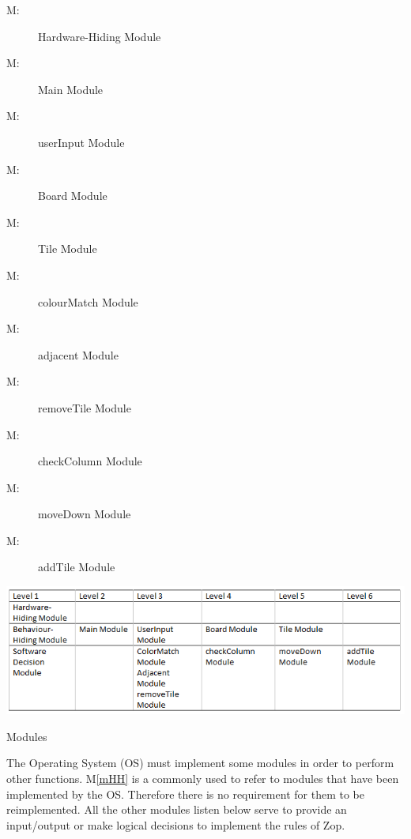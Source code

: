\documentclass[12pt]{article}
\newcounter{mnum}
\newcommand{\mthemnum}{M\themnum}
\newcommand{\mref}[1]{M\ref{#1}}
\begin{document}
\begin{description}
\item [ \mthemnum \label{mHH}:] Hardware-Hiding Module
\item [ \mthemnum \label{mMain}:] Main Module
\item [ \mthemnum \label{mUI}:] userInput Module
\item [ \mthemnum \label{mBoard}:] Board Module
\item [ \mthemnum \label{mTile}:] Tile Module
\item [ \mthemnum \label{mColor}:] colourMatch Module
\item [ \mthemnum \label{mAdj}:] adjacent Module
\item [ \mthemnum \label{mRemove}:] removeTile Module
\item [ \mthemnum \label{mCol}:] checkColumn Module
\item [ \mthemnum \label{mDown}:] moveDown Module
\item [ \mthemnum \label{mAdd}:] addTile Module
\end{description}
\begin{table}[h!]
\includegraphics[width = 17cm]{hierTable}
\caption{Modules}
\label{TblRT}
\end{table}

The Operating System (OS) must implement some modules in order to perform other functions. \mref{mHH} is a commonly used to refer to modules that have been implemented by the OS.  Therefore there is no requirement for them to be reimplemented. All the other modules listen below serve to provide an input/output or make logical decisions to implement the rules of Zop.
\end{document}
